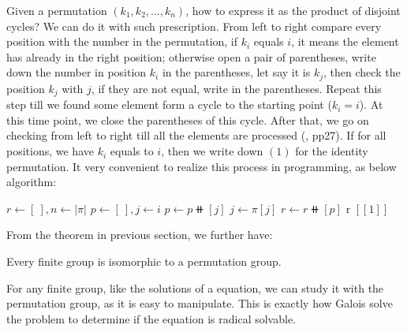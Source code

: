 \documentclass[b5paper]{article}
\begin{document}
Given a permutation $(k_1, k_2, ..., k_n)$, how to express it as the product of disjoint cycles? We can do it with such prescription. From left to right compare every position with the number in the permutation, if $k_i$ equals $i$, it means the element has already in the right position; otherwise open a pair of parentheses, write down the number in position $k_i$ in the parentheses, let say it is $k_j$, then check the position $k_j$ with $j$, if they are not equal, write in the parentheses. Repeat this step till we found some element form a cycle to the starting point ($k_i = i$). At this time point, we close the parentheses of this cycle. After that, we go on checking from left to right till all the elements are processed (\cite{Armstrong1988}, pp27). If for all positions, we have $k_i$ equals to $i$, then we write down $(1)$ for the identity permutation. It very convenient to realize this process in programming, as below algorithm:

\begin{algorithmic}[1]
  \State $r \gets [\ ], n \gets |\pi|$
    \State $p \gets [\ ], j \gets i$
      \State $p \gets p \doubleplus [j]$
      \State $j \gets \pi[j]$
    \EndWhile
      \State $r \gets r \doubleplus [p]$
    \EndIf
  \EndFor
    \State \Return r
  \Else
    \State \Return $[[1]]$ 
  \EndIf
\EndFunction
\end{algorithmic}

From the theorem in previous section, we further have:

\begin{theorem}
Every finite group is isomorphic to a permutation group.
\end{theorem}

For any finite group, like the solutions of a equation, we can study it with the permutation group, as it is easy to manipulate. This is exactly how Galois solve the problem to determine if the equation is radical solvable.

\begin{Exercise}\label{ex:symmetric-group}
\end{Exercise}
\end{document}
